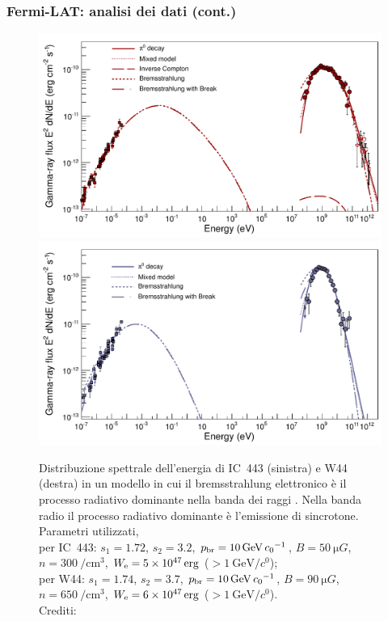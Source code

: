 \documentclass[10pt]{beamer}
\begin{document}
\begin{frame}
  \frametitle{Fermi-LAT: analisi dei dati (cont.)}
  \begin{figure}
    \centering
    \includegraphics[width=0.5\columnwidth]{1231160figS2}
    \includegraphics[width=0.5\columnwidth]{1231160figS3}
    \caption{Distribuzione spettrale dell'energia di IC~443 (sinistra) e W44
      (destra) in un modello in cui il bremsstrahlung elettronico è il processo
      radiativo dominante nella banda dei raggi \PGg.  Nella banda radio il
      processo radiativo dominante è l'emissione di sincrotone.  Parametri
      utilizzati, \\
      per IC~443: $s_{1} = 1.72$, $s_{2} = 3.2$,
      $p_{\textup{br}} = \SI{10}{\giga\electronvolt\per\clight}$,
      $B = \SI{50}{\micro G}$, $n = \SI{300}{\per\centi\metre\cubed}$,
      $W_{\textup{e}} = \SI{5e47}{erg}$
      ($> \SI{1}{\giga\electronvolt\per\clight}$);  \\
      per W44: $s_{1} = 1.74$, $s_{2} = 3.7$,
      $p_{\textup{br}} = \SI{10}{\giga\electronvolt\per\clight}$,
      $B = \SI{90}{\micro G}$, $n = \SI{650}{\per\centi\metre\cubed}$,
      $W_{\textup{e}} = \SI{6e47}{erg}$
      ($> \SI{1}{\giga\electronvolt\per\clight}$). \\
      Crediti: \textcite{2013Sci...339..807A}}
  \end{figure}
\end{frame}
\end{document}
